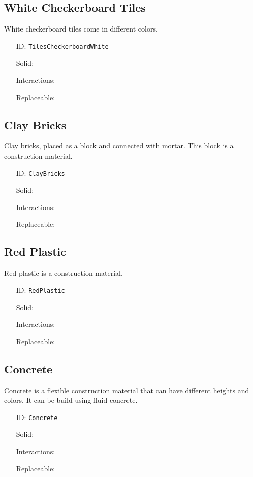 \subsection{White Checkerboard Tiles}\label{subsec:blocks_white checkerboard tiles}
White checkerboard tiles come in different colors.
\newline
\begin{itemize}[nosep]
\item[ID:] \texttt{TilesCheckerboardWhite}
\item[Solid:]  \Checkmark \item[Interactions:]  \Checkmark \item[Replaceable:]  \XSolidBrush \end{itemize}

\subsection{Clay Bricks}\label{subsec:blocks_clay bricks}
Clay bricks, placed as a block and connected with mortar.
                This block is a construction material.
\newline
\begin{itemize}[nosep]
\item[ID:] \texttt{ClayBricks}
\item[Solid:]  \Checkmark \item[Interactions:]  \XSolidBrush \item[Replaceable:]  \XSolidBrush \end{itemize}

\subsection{Red Plastic}\label{subsec:blocks_red plastic}
Red plastic is a construction material.
\newline
\begin{itemize}[nosep]
\item[ID:] \texttt{RedPlastic}
\item[Solid:]  \Checkmark \item[Interactions:]  \XSolidBrush \item[Replaceable:]  \XSolidBrush \end{itemize}

\subsection{Concrete}\label{subsec:blocks_concrete}
Concrete is a flexible construction material that can have different heights and colors.
                It can be build using fluid concrete.
\newline
\begin{itemize}[nosep]
\item[ID:] \texttt{Concrete}
\item[Solid:]  \Checkmark \item[Interactions:]  \Checkmark \item[Replaceable:]  \XSolidBrush \end{itemize}

